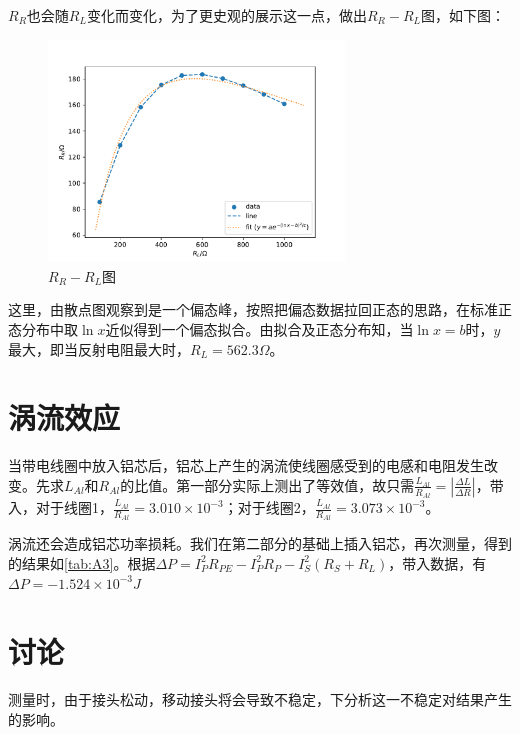 \documentclass[12pt]{article}
\begin{document}
$R_R$也会随$R_L$变化而变化，为了更史观的展示这一点，做出$R_R-R_L$图，如下图：
\begin{figure}[H]
    \centering
    \includegraphics[width=0.7\textwidth]{fig_opt3.pdf}
    \caption{$R_R-R_L$图}
    \label{fig:4}
\end{figure}
这里，由散点图观察到是一个偏态峰，按照把偏态数据拉回正态的思路，在标准正态分布中取$\ln{x}$近似得到一个偏态拟合。由拟合及正态分布知，当$\ln{x}=b$时，$y$最大，即当反射电阻最大时，$R_L=562.3\Omega$。

\section{涡流效应}
当带电线圈中放入铝芯后，铝芯上产生的涡流使线圈感受到的电感和电阻发生改变。先求$L_{Al}$和$R_{Al}$的比值。第一部分实际上测出了等效值，故只需$\frac{L_{Al}}{R_{Al}}=|\frac{\Delta L}{\Delta R}|$，带入，对于线圈1，$\frac{L_{Al}}{R_{Al}}=3.010\times10^{-3}$；对于线圈2，$\frac{L_{Al}}{R_{Al}}=3.073\times10^{-3}$。

涡流还会造成铝芯功率损耗。我们在第二部分的基础上插入铝芯，再次测量，得到的结果如\ref{tab:A3}。根据$\Delta P = I_P^2R_{PE}-I_P^2R_P-I_S^2(R_S+R_L)$，带入数据，有$\Delta P = -1.524\times10^{-3}J$

\section{讨论}
测量时，由于接头松动，移动接头将会导致不稳定，下分析这一不稳定对结果产生的影响。
\end{document}

